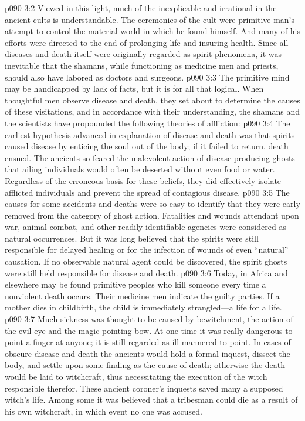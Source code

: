 \vs p090 3:2 Viewed in this light, much of the inexplicable and irrational in the ancient cults is understandable. The ceremonies of the cult were primitive man’s attempt to control the material world in which he found himself. And many of his efforts were directed to the end of prolonging life and insuring health. Since all diseases and death itself were originally regarded as spirit phenomena, it was inevitable that the shamans, while functioning as medicine men and priests, should also have labored as doctors and surgeons.
\vs p090 3:3 The primitive mind may be handicapped by lack of facts, but it is for all that logical. When thoughtful men observe disease and death, they set about to determine the causes of these visitations, and in accordance with their understanding, the shamans and the scientists have propounded the following theories of affliction:
\pc \vs p090 3:4 \bibnobreakspace {} The earliest hypothesis advanced in explanation of disease and death was that spirits caused disease by enticing the soul out of the body; if it failed to return, death ensued. The ancients so feared the malevolent action of disease\hyp{}producing ghosts that ailing individuals would often be deserted without even food or water. Regardless of the erroneous basis for these beliefs, they did effectively isolate afflicted individuals and prevent the spread of contagious disease.
\pc \vs p090 3:5 \bibnobreakspace {} The causes for some accidents and deaths were so easy to identify that they were early removed from the category of ghost action. Fatalities and wounds attendant upon war, animal combat, and other readily identifiable agencies were considered as natural occurrences. But it was long believed that the spirits were still responsible for delayed healing or for the infection of wounds of even “natural” causation. If no observable natural agent could be discovered, the spirit ghosts were still held responsible for disease and death.
\vs p090 3:6 Today, in Africa and elsewhere may be found primitive peoples who kill someone every time a nonviolent death occurs. Their medicine men indicate the guilty parties. If a mother dies in childbirth, the child is immediately strangled---a life for a life.
\pc \vs p090 3:7 \bibnobreakspace {} Much sickness was thought to be caused by bewitchment, the action of the evil eye and the magic pointing bow. At one time it was really dangerous to point a finger at anyone; it is still regarded as ill\hyp{}mannered to point. In cases of obscure disease and death the ancients would hold a formal inquest, dissect the body, and settle upon some finding as the cause of death; otherwise the death would be laid to witchcraft, thus necessitating the execution of the witch responsible therefor. These ancient coroner’s inquests saved many a supposed witch’s life. Among some it was believed that a tribesman could die as a result of his own witchcraft, in which event no one was accused.

